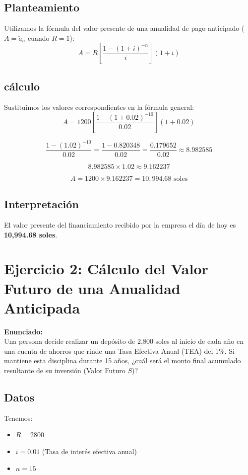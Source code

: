 \documentclass[12pt,a4paper]{article}
\begin{document}
	\subsection*{Planteamiento }
	Utilizamos la fórmula del valor presente de una anualidad de pago anticipado ($A = \ddot{a}_n$ cuando $R=1$):
	$$A = R \left[ \frac{1 - (1 + i)^{-n}}{i} \right] (1 + i)$$
	
	\subsection*{cálculo }
	Sustituimos los valores correspondientes en la fórmula general:
	$$A = 1200 \left[ \frac{1 - (1 + 0.02)^{-10}}{0.02} \right] (1 + 0.02)$$
	
	$$\frac{1 - (1.02)^{-10}}{0.02} = \frac{1 - 0.820348}{0.02} = \frac{0.179652}{0.02} \approx 8.982585$$
	
	$$8.982585 \times 1.02 \approx 9.162237$$
	
	$$A = 1200 \times 9.162237 = 10,994.68 \text{ soles}$$
	
	\subsection*{Interpretación}
	El valor presente del financiamiento recibido por la empresa el día de hoy es \textbf{10,994.68 soles}.
	
	\newpage
	
	\section*{Ejercicio 2: Cálculo del Valor Futuro de una Anualidad Anticipada}
	
	\textbf{Enunciado:} \\
	Una persona decide realizar un depósito de 2,800 soles al inicio de cada año en una cuenta de ahorros que rinde una Tasa Efectiva Anual (TEA) del 1\%. Si mantiene esta disciplina durante 15 años, ¿cuál será el monto final acumulado resultante de su inversión (Valor Futuro $S$)?
	
	\subsection*{Datos}
	Tenemos:
	\begin{itemize}
		\item $R = 2800$ 
		\item $i = 0.01$ (Tasa de interés efectiva anual)
		\item $n = 15$ 
	\end{itemize}
	
\end{document}
